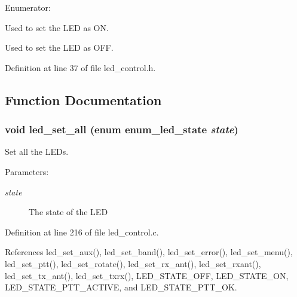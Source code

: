 \begin{Desc}
\item[Enumerator: ]\par
\begin{description}
\item[{\em 
LED\_\-STATE\_\-ON\label{led__control_8h_f3b2f3268e399a66b018faace7ebb18d024f137d8368d2d31196fbcfb8345550}
}]Used to set the LED as ON. \item[{\em 
LED\_\-STATE\_\-OFF\label{led__control_8h_f3b2f3268e399a66b018faace7ebb18d0eebea54c4dc200be6939742385ee789}
}]Used to set the LED as OFF. \end{description}
\end{Desc}



Definition at line 37 of file led\_\-control.h.

\subsection{Function Documentation}
\subsubsection[{led\_\-set\_\-all}]{\setlength{\rightskip}{0pt plus 5cm}void led\_\-set\_\-all (enum {\bf enum\_\-led\_\-state} {\em state})}\label{led__control_8h_d25bd9b40562f08dec9dd7a267f42583}


Set all the LEDs. 

\begin{Desc}
\item[Parameters:]
\begin{description}
\item[{\em state}]The state of the LED \end{description}
\end{Desc}


Definition at line 216 of file led\_\-control.c.

References led\_\-set\_\-aux(), led\_\-set\_\-band(), led\_\-set\_\-error(), led\_\-set\_\-menu(), led\_\-set\_\-ptt(), led\_\-set\_\-rotate(), led\_\-set\_\-rx\_\-ant(), led\_\-set\_\-rxant(), led\_\-set\_\-tx\_\-ant(), led\_\-set\_\-txrx(), LED\_\-STATE\_\-OFF, LED\_\-STATE\_\-ON, LED\_\-STATE\_\-PTT\_\-ACTIVE, and LED\_\-STATE\_\-PTT\_\-OK.


